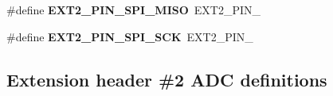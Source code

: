\begin{DoxyCompactItemize}
\item 
\hypertarget{group__saml21__xplained__pro__features__group_gacfb253539d6c34105afe11890f8638bc}{}\#define {\bfseries E\+X\+T2\+\_\+\+P\+I\+N\+\_\+\+S\+P\+I\+\_\+\+M\+I\+S\+O}~E\+X\+T2\+\_\+\+P\+I\+N\+\_\label{group__saml21__xplained__pro__features__group_gacfb253539d6c34105afe11890f8638bc}

\item 
\hypertarget{group__saml21__xplained__pro__features__group_gaa2dbe5185b6019956b965574258ebe3d}{}\#define {\bfseries E\+X\+T2\+\_\+\+P\+I\+N\+\_\+\+S\+P\+I\+\_\+\+S\+C\+K}~E\+X\+T2\+\_\+\+P\+I\+N\+\_\label{group__saml21__xplained__pro__features__group_gaa2dbe5185b6019956b965574258ebe3d}

\end{DoxyCompactItemize}
\subsection*{Extension header \#2 A\+D\+C definitions}
